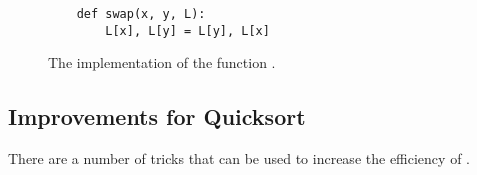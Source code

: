 \begin{figure}[!ht]
  \centering
\begin{verbatim}
    def swap(x, y, L):
        L[x], L[y] = L[y], L[x]    
\end{verbatim}
\vspace*{-0.7cm}
  \caption{The implementation of the function .}
  \label{fig:quick-sort-array.stlx-swap}
\end{figure}


\subsection{Improvements for Quicksort}
There are a number of tricks that can be used to increase the efficiency of .
